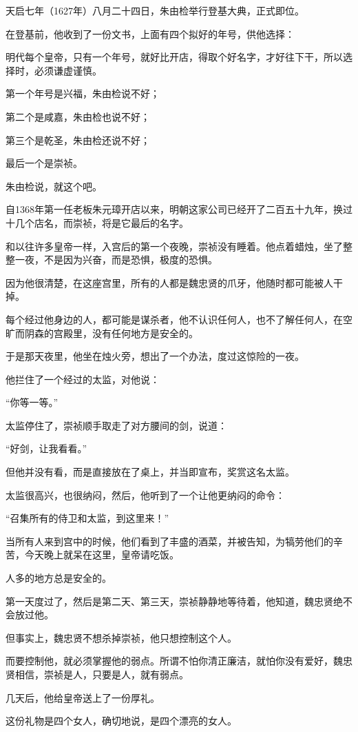 \begin{multicols}{\theparacolNo}
天启七年（1627年）八月二十四日，朱由检举行登基大典，正式即位。

在登基前，他收到了一份文书，上面有四个拟好的年号，供他选择：

明代每个皇帝，只有一个年号，就好比开店，得取个好名字，才好往下干，所以选择时，必须谦虚谨慎。

第一个年号是兴福，朱由检说不好；

第二个是咸嘉，朱由检也说不好；

第三个是乾圣，朱由检还说不好；

最后一个是崇祯。

朱由检说，就这个吧。

自1368年第一任老板朱元璋开店以来，明朝这家公司已经开了二百五十九年，换过十几个店名，而崇祯，将是它最后的名字。

和以往许多皇帝一样，入宫后的第一个夜晚，崇祯没有睡着。他点着蜡烛，坐了整整一夜，不是因为兴奋，而是恐惧，极度的恐惧。

因为他很清楚，在这座宫里，所有的人都是魏忠贤的爪牙，他随时都可能被人干掉。

每个经过他身边的人，都可能是谋杀者，他不认识任何人，也不了解任何人，在空旷而阴森的宫殿里，没有任何地方是安全的。

于是那天夜里，他坐在烛火旁，想出了一个办法，度过这惊险的一夜。

他拦住了一个经过的太监，对他说：

“你等一等。”

太监停住了，崇祯顺手取走了对方腰间的剑，说道：

“好剑，让我看看。”

但他并没有看，而是直接放在了桌上，并当即宣布，奖赏这名太监。

太监很高兴，也很纳闷，然后，他听到了一个让他更纳闷的命令：

“召集所有的侍卫和太监，到这里来！”

当所有人来到宫中的时候，他们看到了丰盛的酒菜，并被告知，为犒劳他们的辛苦，今天晚上就呆在这里，皇帝请吃饭。

人多的地方总是安全的。

第一天度过了，然后是第二天、第三天，崇祯静静地等待着，他知道，魏忠贤绝不会放过他。

但事实上，魏忠贤不想杀掉崇祯，他只想控制这个人。

而要控制他，就必须掌握他的弱点。所谓不怕你清正廉洁，就怕你没有爱好，魏忠贤相信，崇祯是人，只要是人，就有弱点。

几天后，他给皇帝送上了一份厚礼。

这份礼物是四个女人，确切地说，是四个漂亮的女人。


\end{multicols}
